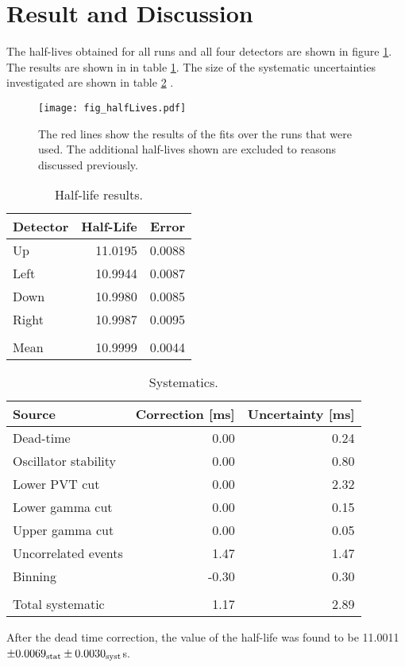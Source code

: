 \documentclass[MaxHughesThesis.tex]{subfiles}
\begin{document}
\section{Result and Discussion}
\label{sec:result}

The half-lives obtained for all runs and all four detectors are shown in figure \ref{fig:PVT2by2}.
The results  are shown in  in table \ref{tab:PVTTable}.
The size of the systematic uncertainties investigated are shown in table \ref{tab:SysTable} .
\begin{figure}[!htb]
	\centerline{\texttt{[image: fig\_halfLives.pdf]}}
	\caption{The red lines show the results of the fits over the runs that were used.
		 The additional half-lives shown are excluded to reasons discussed previously. 
		}
	\label{fig:PVT2by2}
\end{figure}
	\begin{table}[!hbt]
			\centering
			\caption{Half-life results.}
			\begin{tabular}{lrr}
			Detector & Half-Life & Error \\ \hline
			Up & 11.0195 & 0.0088 \\
			Left & 10.9944 & 0.0087 \\
			Down & 10.9980 & 0.0085 \\
			Right & 10.9987 & 0.0095 \\ 
			      &		& 	 \\
			Mean & 10.9999 & 0.0044
			\end{tabular}
			\label{tab:PVTTable}
	\end{table}
\begin{table}[!hbt]
	\caption{Systematics.}
	\centering
	\label{tab:err-budget}
		\begin{tabular}{lrr}
		Source & Correction [ms] & Uncertainty [ms] \\ \hline
		Dead-time & 0.00 & 0.24 \\
		Oscillator stability & 0.00 & 0.80 \\
		Lower PVT cut & 0.00 & 2.32 \\
		Lower gamma cut & 0.00 &  0.15\\
		Upper gamma cut  & 0.00 & 0.05 \\ 
		Uncorrelated events & 1.47 & 1.47 \\
		Binning & -0.30 & 0.30 \\
			&	&	\\
		Total systematic & 1.17 & 2.89
		\end{tabular}
	\label{tab:SysTable}
\end{table}
After the dead time correction, the value of the half-life was found to be 11.0011 $\pm 0.0069_{\rm{stat}} \pm 0.0030_{\rm{syst}} $s.
\end{document}
